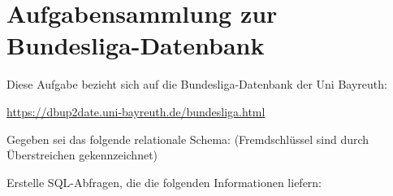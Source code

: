 \documentclass{lehramt-informatik-aufgabe}
\begin{document}

\section{Aufgabensammlung zur Bundesliga-Datenbank
}

Diese Aufgabe bezieht sich auf die Bundesliga-Datenbank der Uni
Bayreuth:

\url{https://dbup2date.uni-bayreuth.de/bundesliga.html}

Gegeben sei das folgende relationale Schema: (Fremdschlüssel sind durch
Überstreichen gekennzeichnet)

Erstelle SQL-Abfragen, die die folgenden Informationen liefern:





\end{document}

